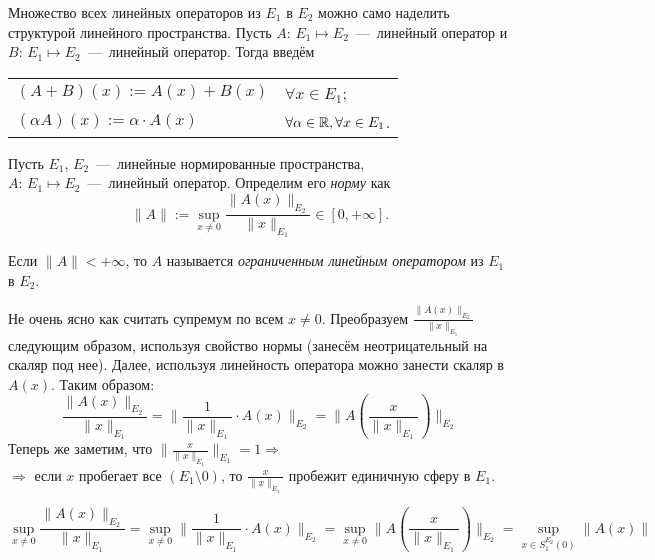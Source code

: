 \begin{note}
    Множество всех линейных операторов из $E_1$ в $E_2$ можно само наделить структурой линейного пространства. Пусть $A$: $E_1 \mapsto E_2$~---~линейный оператор и $B$: $E_1 \mapsto E_2$~---~линейный оператор. Тогда введём 
    \begin{table}[h]
    \centering
    \begin{tabular}{ll}
    $(A+B) (x) := A(x) + B(x)$ & $\forall x \in E_1$; \\
    $(\alpha A)(x) := \alpha \cdot A(x)$ & $\forall \alpha \in \mathbb{R}, \forall x \in E_1$.
    \end{tabular}
    \end{table}
\end{note}

\begin{definition}
    Пусть $E_1$, $E_2$~---~линейные нормированные пространства, \\ $A$: $E_1 \mapsto E_2 $~---~линейный оператор. Определим его \textit{норму} как 
    \[ \|A\| := \sup_{x \neq 0}{\frac{\|A(x)\|_{E_2}}{\|x\|_{E_1}}} \in [0, +\infty]. \]

    Если $\|A\| < +\infty$, то $A$ называется \textit{ограниченным линейным оператором} из $E_1$ в $E_2$.
\end{definition}

\begin{note}
    Не очень ясно как считать супремум по всем $x \neq 0$. Преобразуем $\frac{\|A(x)\|_{E_2}}{\|x\|_{E_1}}$ следующим образом, используя свойство нормы (занесём неотрицательный на скаляр под нее). Далее, используя линейность оператора можно занести скаляр в $A(x)$. Таким образом: \\
    \[ \frac{\|A(x)\|_{E_2}}{\|x\|_{E_1}} = \bigg\|\frac{1}{\|x\|_{E_1}} \cdot A(x) \bigg\|_{E_2} = \bigg\|A \left( \frac{x}{\|x\|_{E_1}} \right) \bigg\|_{E_2} \]
    Теперь же заметим, что $\bigg\| \frac{x}{\|x\|_{E_1}} \bigg\|_{E_1} = 1 \Longrightarrow $ \\ $\Longrightarrow $ если $x$ пробегает все $\left(E_1 \setminus 0\right)$, то $ \frac{x}{\|x\|_{E_1}} $ пробежит единичную сферу в $E_1$.

    \[ \sup_{x \neq 0} \frac{\|A(x)\|_{E_2}}{\|x\|_{E_1}} = \sup_{x \neq 0} \bigg\|\frac{1}{\|x\|_{E_1}} \cdot A(x) \bigg\|_{E_2} = \sup_{x \neq 0} \bigg\|A \left( \frac{x}{\|x\|_{E_1}} \right) \bigg\|_{E_2} = \sup_{x \in S_1^{E_2}(0)}{\|A(x)\|}\] 

\end{note}

